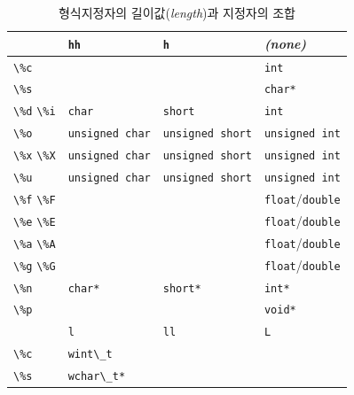 \documentclass[a4paper,12pt]{book}
\newcommand{\V}[1]{\Verb|#1|}
\begin{document}
\begingroup
    \centering
    \begin{longtable}{ || m{5em} || m{7.5em} | m{10em} | m{7.5em} || }
        \caption{형식지정자의 길이값(\textit{length})과 지정자의 조합}
        \label{Tab:format-length}

        \hline                 & \V{hh}            & \V{h}                  & \textit{(none)}      \\
        \hline
        \hline \V{\%c}         &                   &                        & \V{int}              \\ 
        \hline \V{\%s}         &                   &                        & \V{char*}            \\ 
        \hline \V{\%d} \V{\%i} & \V{char}          & \V{short}              & \V{int}              \\
        \hline \V{\%o}         & \V{unsigned char} & \V{unsigned short}     & \V{unsigned int}     \\
        \hline \V{\%x} \V{\%X} & \V{unsigned char} & \V{unsigned short}     & \V{unsigned int}     \\
        \hline \V{\%u}         & \V{unsigned char} & \V{unsigned short}     & \V{unsigned int}     \\
        \hline \V{\%f} \V{\%F} &                   &                        & \V{float}/\V{double} \\
        \hline \V{\%e} \V{\%E} &                   &                        & \V{float}/\V{double} \\
        \hline \V{\%a} \V{\%A} &                   &                        & \V{float}/\V{double} \\
        \hline \V{\%g} \V{\%G} &                   &                        & \V{float}/\V{double} \\
        \hline \V{\%n}         & \V{char*}         & \V{short*}             & \V{int*}             \\
        \hline \V{\%p}         &                   &                        & \V{void*}            \\ 
        \hline
        \hline                 & \V{l}             & \V{ll}                 & \V{L}                \\
        \hline
        \hline \V{\%c}         & \V{wint\_t}       &                        &                      \\ 
        \hline \V{\%s}         & \V{wchar\_t*}     &                        &                      \\ 

\end{longtable}
\end{document}
